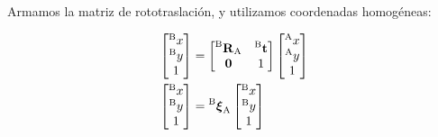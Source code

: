 \begin{frame}
Armamos la matriz de rototraslación, y utilizamos coordenadas homogéneas:

    \begin{align*}
        \begin{bmatrix}
            \toCoord{x}{B}\\
            \toCoord{y}{B}\\
            1
        \end{bmatrix} &=
        \begin{bmatrix}
            \rotationCoord{B}{A} & \toCoord{\translation}{B}\\
            \vec{0} & 1
        \end{bmatrix}
        \begin{bmatrix}
            \toCoord{x}{A}\\
            \toCoord{y}{A}\\
            1
        \end{bmatrix}\\
        \begin{bmatrix}
            \toCoord{x}{B}\\
            \toCoord{y}{B}\\
            1
        \end{bmatrix} &=
        \transform{B}{A}
        \begin{bmatrix}
            \toCoord{x}{B}\\
            \toCoord{y}{B}\\
            1
        \end{bmatrix}
    \end{align*}


\end{frame}



